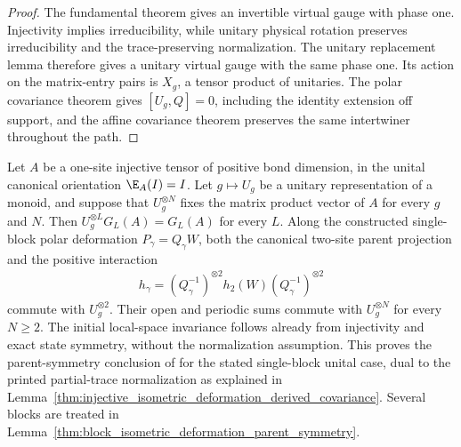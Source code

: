 \begin{proof}
    \leanok
    The fundamental theorem gives an invertible virtual gauge with
    phase one. Injectivity implies irreducibility, while unitary
    physical rotation preserves irreducibility and the trace-preserving
    normalization. The unitary replacement lemma therefore gives a
    unitary virtual gauge with the same phase one. Its action on the
    matrix-entry pairs is $X_g$, a tensor product of unitaries.
    The polar covariance theorem gives $[U_g,Q]=0$, including the
    identity extension off support, and the affine covariance theorem
    preserves the same intertwiner throughout the path.
\end{proof}

\begin{lemma}
    \label{thm:injective_isometric_deformation_parent_symmetry}
    \leanok
    Let $A$ be a one-site injective tensor of positive bond dimension,
    in the unital canonical orientation $\E_A(I)=I$. Let
    $g\mapsto U_g$ be a unitary
    representation of a monoid, and suppose that $U_g^{\otimes N}$
    fixes the matrix product vector of $A$ for every $g$ and $N$.
    Then $U_g^{\otimes L}G_L(A)=G_L(A)$ for every $L$.
    Along the constructed single-block polar deformation
    $P_\gamma=Q_\gamma W$, both the canonical two-site parent projection
    and the positive interaction
    \begin{align*}
        h_\gamma=(Q_\gamma^{-1})^{\otimes2}
        h_2(W)(Q_\gamma^{-1})^{\otimes2}
    \end{align*}
    commute with $U_g^{\otimes2}$. Their open and periodic sums
    commute with $U_g^{\otimes N}$ for every $N\geq2$.
    The initial local-space invariance follows already from injectivity
    and exact state symmetry, without the normalization assumption.
    This proves the parent-symmetry conclusion of
    \cite[lines~645--676]{Schuch2011Phases} for the stated single-block
    unital case, dual to the printed partial-trace normalization as
    explained in Lemma~\ref{thm:injective_isometric_deformation_derived_covariance}.
    Several blocks are treated in
    Lemma~\ref{thm:block_isometric_deformation_parent_symmetry}.
\end{lemma}

